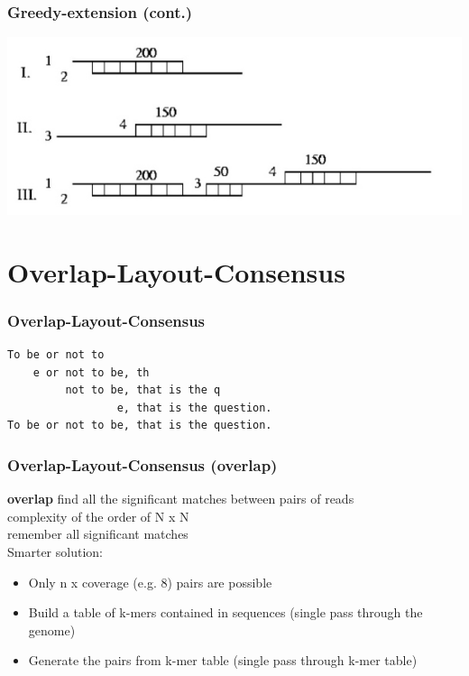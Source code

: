 \documentclass[pdf]{beamer}
\begin{document}
\begin{frame}
\frametitle{Greedy-extension (cont.)}
\begin{center}
\includegraphics[scale=1]{Figures/greedy.jpg} 
\end{center}
\end{frame}

\section{Overlap-Layout-Consensus}
\begin{frame}[fragile]
\frametitle{Overlap-Layout-Consensus}
\begin{verbatim}
To be or not to
    e or not to be, th
         not to be, that is the q
                 e, that is the question.
To be or not to be, that is the question.
\end{verbatim}
\end{frame}

\begin{frame}
\frametitle{Overlap-Layout-Consensus (overlap)}
\textbf{overlap}
find all the significant matches between pairs of reads\\
complexity of the order of N x N\\
remember all significant matches\\
Smarter solution:
\begin{small}
\begin{itemize}
\item Only n x coverage (e.g. 8) pairs are possible
\item Build a table of k-mers contained in sequences (single pass through the genome)
\item Generate the pairs from k-mer table (single pass through k-mer table)
\end{itemize}
\end{small}
\end{frame}
\end{document}
